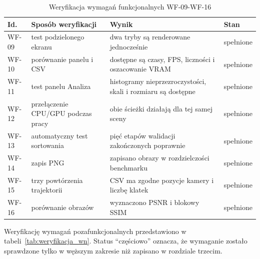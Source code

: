 \begin{table}[htbp]
  \centering
  \caption{Weryfikacja wymagań funkcjonalnych WF-09-WF-16}
  \label{tab:weryfikacja_wf_b}
  \scriptsize
  \renewcommand{\arraystretch}{1.12}
  \begin{tabularx}{\textwidth}{
      >{\raggedright\arraybackslash}p{}
      >{\raggedright\arraybackslash}p{}
      >{\raggedright\arraybackslash}X
      >{\raggedright\arraybackslash}p{}}
    \toprule
    \textbf{Id.} & \textbf{Sposób weryfikacji} & \textbf{Wynik} & \textbf{Stan} \\
    \midrule
    WF-09 & test podzielonego ekranu & dwa tryby są renderowane jednocześnie & spełnione \\
    WF-10 & porównanie panelu i CSV & dostępne są czasy, FPS, liczności i oszacowanie VRAM & spełnione \\
    WF-11 & test panelu Analiza & histogramy nieprzezroczystości, skali i rozmiaru są dostępne & spełnione \\
    WF-12 & przełączenie CPU/GPU podczas pracy & obie ścieżki działają dla tej samej sceny & spełnione \\
    WF-13 & automatyczny test sortowania & pięć etapów walidacji zakończonych poprawnie & spełnione \\
    WF-14 & zapis PNG & zapisano obrazy w rozdzielczości benchmarku & spełnione \\
    WF-15 & trzy powtórzenia trajektorii & CSV ma zgodne pozycje kamery i liczbę klatek & spełnione \\
    WF-16 & porównanie obrazów & wyznaczono PSNR i blokowy SSIM & spełnione \\
    \bottomrule
  \end{tabularx}
\end{table}

Weryfikację wymagań pozafunkcjonalnych przedstawiono w tabeli~\ref{tab:weryfikacja_wn}. Status ``częściowo'' oznacza, że wymaganie zostało sprawdzone tylko w węższym zakresie niż zapisano w rozdziale trzecim.

